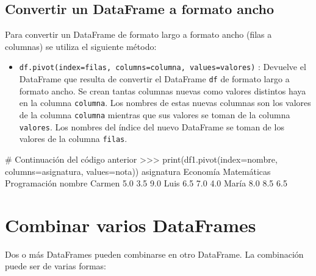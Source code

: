 \documentclass[
  spanish,
  a4paper,
]{scrreport}
\newenvironment{Shaded}{\begin{snugshade}}{\end{snugshade}}
\newcommand{\BuiltInTok}[1]{\textcolor[rgb]{0.00,0.23,0.31}{#1}}
\newcommand{\CommentTok}[1]{\textcolor[rgb]{0.37,0.37,0.37}{#1}}
\newcommand{\FloatTok}[1]{\textcolor[rgb]{0.68,0.00,0.00}{#1}}
\newcommand{\NormalTok}[1]{\textcolor[rgb]{0.00,0.23,0.31}{#1}}
\newcommand{\OperatorTok}[1]{\textcolor[rgb]{0.37,0.37,0.37}{#1}}
\newcommand{\StringTok}[1]{\textcolor[rgb]{0.13,0.47,0.30}{#1}}
\providecommand{\tightlist}{%
  \setlength{\itemsep}{0pt}\setlength{\parskip}{0pt}}
\begin{document}
\subsection{Convertir un DataFrame a formato
ancho}\label{convertir-un-dataframe-a-formato-ancho}

Para convertir un DataFrame de formato largo a formato ancho (filas a
columnas) se utiliza el siguiente método:

\begin{itemize}
\tightlist
\item
  \texttt{df.pivot(index=filas,\ columns=columna,\ values=valores)} :
  Devuelve el DataFrame que resulta de convertir el DataFrame
  \texttt{df} de formato largo a formato ancho. Se crean tantas columnas
  nuevas como valores distintos haya en la columna \texttt{columna}. Los
  nombres de estas nuevas columnas son los valores de la columna
  \texttt{columna} mientras que sus valores se toman de la columna
  \texttt{valores}. Los nombres del índice del nuevo DataFrame se toman
  de los valores de la columna \texttt{filas}.
\end{itemize}

\begin{Shaded}
\begin{Highlighting}[]
\CommentTok{\# Continuación del código anterior}
\OperatorTok{\textgreater{}\textgreater{}\textgreater{}} \BuiltInTok{print}\NormalTok{(df1.pivot(index}\OperatorTok{=}\StringTok{\textquotesingle{}nombre\textquotesingle{}}\NormalTok{, columns}\OperatorTok{=}\StringTok{\textquotesingle{}asignatura\textquotesingle{}}\NormalTok{, values}\OperatorTok{=}\StringTok{\textquotesingle{}nota\textquotesingle{}}\NormalTok{))}
\NormalTok{asignatura  Economía  Matemáticas  Programación}
\NormalTok{nombre                                  }
\NormalTok{Carmen           }\FloatTok{5.0}          \FloatTok{3.5}           \FloatTok{9.0}
\NormalTok{Luis             }\FloatTok{6.5}          \FloatTok{7.0}           \FloatTok{4.0}
\NormalTok{María            }\FloatTok{8.0}          \FloatTok{8.5}           \FloatTok{6.5}
\end{Highlighting}
\end{Shaded}

\section{Combinar varios DataFrames}\label{combinar-varios-dataframes}

Dos o más DataFrames pueden combinarse en otro DataFrame. La combinación
puede ser de varias formas:
\end{document}
